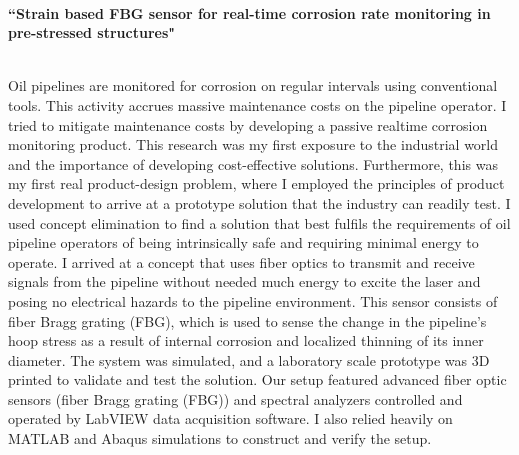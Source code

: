 \documentclass[12pt]{article} %
\begin{document}
{	
	~
	~
	~
	~

	\medskip %


	{\raggedright\textbf{``Strain based FBG sensor for real-time corrosion rate monitoring in pre-stressed structures"}}\\
	Oil pipelines are monitored for corrosion on regular intervals using conventional tools. This activity accrues massive maintenance costs on the pipeline operator. I tried to mitigate maintenance costs by developing a passive realtime corrosion monitoring product. This research was my first exposure to the industrial world and the importance of developing cost-effective solutions. Furthermore, this was my first real product-design problem, where I employed the principles of product development to arrive at a prototype solution that the industry can readily test.
	I used concept elimination to find a solution that best fulfils the requirements of oil pipeline operators of being intrinsically safe and requiring minimal energy to operate. I arrived at a concept that uses fiber optics to transmit and receive signals from the pipeline without needed much energy to excite the laser and posing no electrical hazards to the pipeline environment. This sensor consists of fiber Bragg grating (FBG), which is used to sense the change in the pipeline's hoop stress as a result of internal corrosion and localized thinning of its inner diameter. The system was simulated, and a laboratory scale prototype was 3D printed to validate and test the solution. Our setup featured advanced fiber optic sensors (fiber Bragg grating (FBG)) and spectral analyzers controlled and operated by LabVIEW data acquisition software. I also relied heavily on MATLAB and Abaqus simulations to construct and verify the setup.

}
\end{document}

